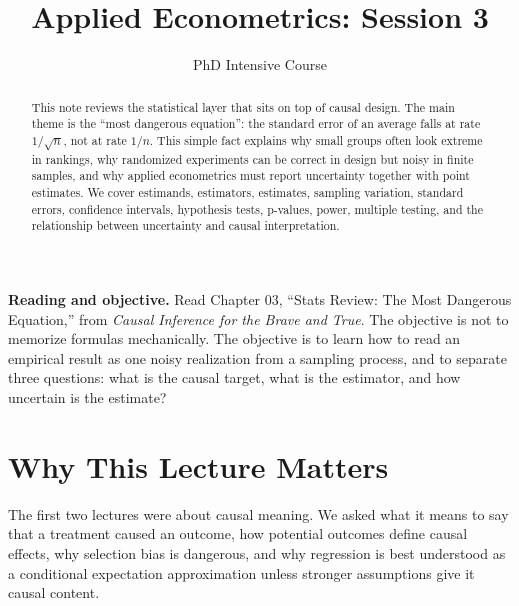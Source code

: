 

\title{Applied Econometrics: Session 3}
\author{PhD Intensive Course}
\date{}


\setlength{\headheight}{26pt}


\maketitle

\begin{abstract}
This note reviews the statistical layer that sits on top of causal design.
The main theme is the ``most dangerous equation'': the standard error of an
average falls at rate $1/\sqrt{n}$, not at rate $1/n$. This simple fact explains
why small groups often look extreme in rankings, why randomized experiments
can be correct in design but noisy in finite samples, and why applied
econometrics must report uncertainty together with point estimates. We cover
estimands, estimators, estimates, sampling variation, standard errors,
confidence intervals, hypothesis tests, p-values, power, multiple testing, and
the relationship between uncertainty and causal interpretation.
\end{abstract}

\begin{boxD}
\textbf{Reading and objective.} Read Chapter 03, ``Stats Review: The Most
Dangerous Equation,'' from \emph{Causal Inference for the Brave and True}.
The objective is not to memorize formulas mechanically. The objective is to
learn how to read an empirical result as one noisy realization from a sampling
process, and to separate three questions: what is the causal target, what is
the estimator, and how uncertain is the estimate?
\end{boxD}

\section{Why This Lecture Matters}

The first two lectures were about causal meaning. We asked what it means to
say that a treatment caused an outcome, how potential outcomes define causal
effects, why selection bias is dangerous, and why regression is best understood
as a conditional expectation approximation unless stronger assumptions give it
causal content.

